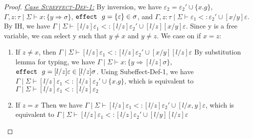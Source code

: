 \begin{proof}
\noindent\underline{\textit{Case \textsc{Subeffect-Def-1}:}}
    By inversion, we have 
    $\varepsilon_2 = \varepsilon_2' \cup \{x.g\}$,
    $\Gamma, z:\tau \mid \Sigma \vdash x: \{y \Rightarrow \sigma \}$,
    \mbox{$\mathtt{effect}~\ g = \{\varepsilon\} \in \sigma $},
    and 
    $\Gamma, z:\tau \mid \Sigma \vdash \varepsilon_1 <: \varepsilon_2' \cup [x/y]\varepsilon$.
    By IH, we have 
    \mbox{$\Gamma \mid \Sigma \vdash [l/z]\varepsilon_1 <: [l/z]\varepsilon_2' \cup [l/z][x/y]\varepsilon$}.
    Since y is a free variable, we can select y such that $y \neq x$ and $y\neq z$. We case on if $x = z$:
    \begin{enumerate}
    \item If $z \neq x$, then
    $\Gamma \mid \Sigma \vdash [l/z]\varepsilon_1 <: [l/z]\varepsilon_2' \cup [x/y][l/z]\varepsilon$
    By substitution lemma for typing, we have 
    $\Gamma \mid \Sigma \vdash x : \{y \Rightarrow [l/z]\sigma \}$,
    $\mathtt{effect}~\ g = [l/z]\varepsilon \in [l/z]\sigma$.
    Using Subeffect-Def-1, we have
    $\Gamma \mid \Sigma \vdash [l/z]\varepsilon_1 <: [l/z]\varepsilon_2' \cup \{x.g\}$,
    which is equivalent to 
    $\Gamma \mid \Sigma \vdash [l/z]\varepsilon_1 <: [l/z]\varepsilon_2$
    \item If $z = x$
     Then we have
     $\Gamma \mid \Sigma \vdash [l/z]\varepsilon_1 <:[l/z]\varepsilon_2' \cup [l/x, y]\varepsilon$,
     which is equivalent to
     $\Gamma \mid \Sigma \vdash [l/z]\varepsilon_1  <:[l/z]\varepsilon_2' \cup [l/y][l/z]\varepsilon$
     

\end{enumerate}
\end{proof}

